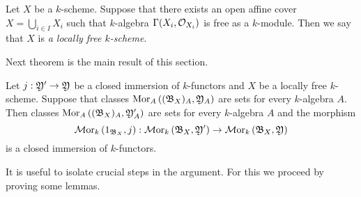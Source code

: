\begin{definition}
Let $X$ be a $k$-scheme. Suppose that there exists an open affine cover $X = \bigcup_{i\in I}X_i$ such that $k$-algebra $\Gamma(X_i,{\mathcal O}_{X_i})$ is free as a $k$-module. Then we say that $X$ is \textit{a locally free $k$-scheme}.
\end{definition}
\noindent
Next theorem is the main result of this section.

\begin{theorem}\label{theorem:closedimmersionsandinternalhom}
Let $j:{\mathfrak Y}'\rightarrow {\mathfrak Y}$ be a closed immersion of $k$-functors and $X$ be a locally free $k$-scheme. Suppose that classes $\mathrm{Mor}_A\left(({\mathfrak B}_X)_A,{\mathfrak Y}_A\right)$ are sets for every $k$-algebra $A$. Then classes $\mathrm{Mor}_A\left(({\mathfrak B}_X)_A,{\mathfrak Y}'_A\right)$ are sets for every $k$-algebra $A$ and the morphism
$$\mathcal{M}\mathrm{or}_k\left(1_{{\mathfrak B}_X},j\right):\mathcal{M}\mathrm{or}_k\left({\mathfrak B}_X,{\mathfrak Y}'\right)\rightarrow \mathcal{M}\mathrm{or}_k\left({\mathfrak B}_X,{\mathfrak Y}\right)$$
is a closed immersion of $k$-functors.
\end{theorem}
\noindent
It is useful to isolate crucial steps in the argument. For this we proceed by proving some lemmas.


